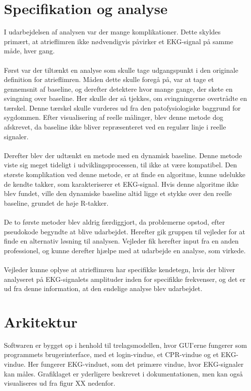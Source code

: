 \section{Specifikation og analyse}
I udarbejdelsen af analysen var der mange komplikationer. Dette skyldes primært, at atrieflimren ikke nødvendigvis påvirker et EKG-signal på samme måde, hver gang.\\ \\
Først var der tiltænkt en analyse som skulle tage udgangspunkt i den originale definition for atrieflimren. Måden dette skulle foregå på, var at tage et gennemsnit af baseline, og derefter detektere hvor mange gange, der skete en svingning over baseline. Her skulle der så tjekkes, om svingningerne overtrådte en tærskel. Denne tærskel skulle vurderes ud fra den patofysiologiske baggrund for sygdommen. Efter visualisering af reelle målinger, blev denne metode dog afskrevet, da baseline ikke bliver repræsenteret ved en regulær linje i reelle signaler. \\ \\ 
Derefter blev der udtænkt en metode med en dynamisk baseline. Denne metode viste sig meget tideligt i udviklingsprocessen, til ikke at være kompatibel. Den største komplikation ved denne metode, er at finde en algoritme, kunne udelukke de kendte takker, som karakteriserer et EKG-signal. Hvis denne algoritme ikke blev fundet, ville den dynamiske baseline altid ligge et stykke over den reelle baseline, grundet de høje R-takker. \\ \\
De to første metoder blev aldrig færdiggjort, da problemerne opstod, efter pseudokode begyndte at blive udarbejdet. Herefter gik gruppen til vejleder for at finde en alternativ løsning til analysen. Vejleder fik herefter input fra en anden professionel, og kunne derefter hjælpe med at udarbejde en analyse, som virkede.\\ \\
Vejleder kunne oplyse at atrieflimren har specifikke kendetegn, hvis der bliver analyseret på EKG-signalets amplituder inden for specifikke frekvenser, og det er ud fra denne information, at den endelige analyse blev udarbejdet. 

\section{Arkitektur}
Softwaren er bygget op i henhold til trelagsmodellen, hvor GUI’erne fungerer som programmets brugerinterface, med et login-vindue, et CPR-vindue og et EKG-vindue. Her fungerer EKG-vinduet, som det primære vindue, hvor EKG-signaler kan måles. Grafiklaget er yderligere beskrevet i dokumentationen, men kan også visualiseres ud fra figur XX nedenfor.

